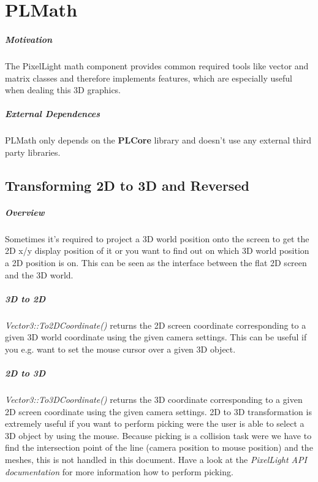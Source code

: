 \chapter{PLMath}


\paragraph{Motivation}
The PixelLight math component provides common required tools like vector and matrix classes and therefore implements features, which are especially useful when dealing this 3D graphics.


\paragraph{External Dependences}
PLMath only depends on the \textbf{PLCore} library and doesn't use any external third party libraries.




\section{Transforming 2D to 3D and Reversed}


\paragraph{Overview}
Sometimes it's required to project a 3D world position onto the screen to get the 2D x/y display position of it or you want to find out on which 3D world position a 2D position is on. This can be seen as the interface between the flat 2D screen and the 3D world.


\paragraph{3D to 2D}
\emph{Vector3::To2DCoordinate()} returns the 2D screen coordinate corresponding to a given 3D world coordinate using the given camera settings. This can be useful if you e.g. want to set the mouse cursor over a given 3D object.


\paragraph{2D to 3D}
\emph{Vector3::To3DCoordinate()} returns the 3D coordinate corresponding to a given 2D screen coordinate using the given camera settings. 2D to 3D transformation is extremely useful if you want to perform picking were the user is able to select a 3D object by using the mouse. Because picking is a collision task were we have to find the intersection point of the line (camera position to mouse position) and the meshes, this is not handled in this document. Have a look at the \emph{PixelLight API documentation} for more information how to perform picking.





